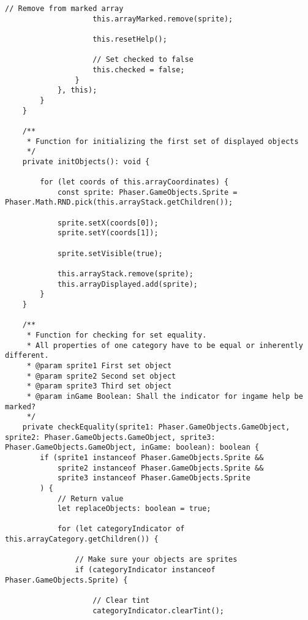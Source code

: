 \begin{lstlisting}[style=TypeScript, caption={gameScene.ts}]
                    // Remove from marked array
                    this.arrayMarked.remove(sprite);

                    this.resetHelp();

                    // Set checked to false
                    this.checked = false;
                }
            }, this);
        }
    }

    /**
     * Function for initializing the first set of displayed objects
     */
    private initObjects(): void {

        for (let coords of this.arrayCoordinates) {
            const sprite: Phaser.GameObjects.Sprite = Phaser.Math.RND.pick(this.arrayStack.getChildren());

            sprite.setX(coords[0]);
            sprite.setY(coords[1]);

            sprite.setVisible(true);

            this.arrayStack.remove(sprite);
            this.arrayDisplayed.add(sprite);
        }
    }

    /**
     * Function for checking for set equality.
     * All properties of one category have to be equal or inherently different.
     * @param sprite1 First set object
     * @param sprite2 Second set object
     * @param sprite3 Third set object
     * @param inGame Boolean: Shall the indicator for ingame help be marked?
     */
    private checkEquality(sprite1: Phaser.GameObjects.GameObject, sprite2: Phaser.GameObjects.GameObject, sprite3: Phaser.GameObjects.GameObject, inGame: boolean): boolean {
        if (sprite1 instanceof Phaser.GameObjects.Sprite &&
            sprite2 instanceof Phaser.GameObjects.Sprite &&
            sprite3 instanceof Phaser.GameObjects.Sprite
        ) {
            // Return value
            let replaceObjects: boolean = true;

            for (let categoryIndicator of this.arrayCategory.getChildren()) {

                // Make sure your objects are sprites
                if (categoryIndicator instanceof Phaser.GameObjects.Sprite) {

                    // Clear tint
                    categoryIndicator.clearTint();


\end{lstlisting}
